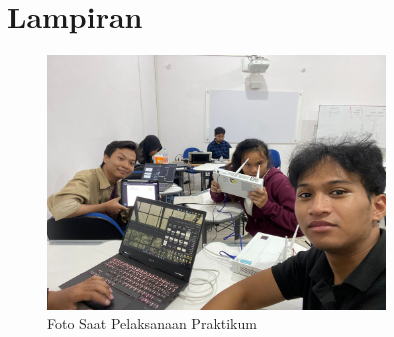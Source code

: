 \section*{Lampiran} %

\begin{figure}[H]
    \centering
    \includegraphics[width=0.8\textwidth]{img/dokum.jpeg}
    \caption{Foto Saat Pelaksanaan Praktikum}
    \label{fig:foto_keren}
\end{figure}